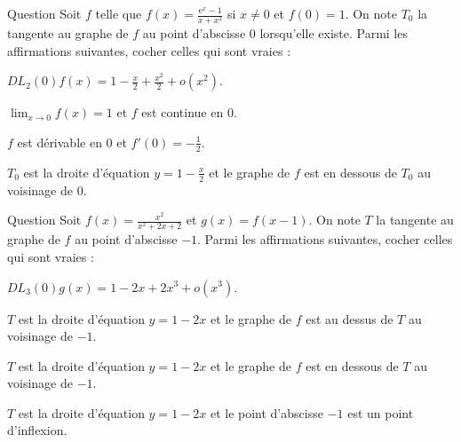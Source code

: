 \begin{multi}[multiple,feedback=
{Pour écrire le \(DL_2(0)f(x)\), on utilise le \(DL_3(0)(\mathrm{e}^{x}-1)\). La division suivant les puissances croissantes donne :
\[\displaystyle DL_2(0)f(x)=1-\frac{x}{2}+\frac{2x^2}{3}+o(x^2).\]
Ainsi \(\displaystyle \lim _{x\to 0}f(x)=1\) et \(f\) est continue en \(0\) et, puisque \(f\) admet un \(DL_1(0)\), \(f\) est dérivable en \(0\). De plus, \(T_0\) est la droite d'équation \(\displaystyle y=1-\frac{x}{2}\) et puisque \(\displaystyle f(x)-y=\frac{2x^2}{3}+o(x^2)\geq 0\) au voisinage de \(0\) : le graphe de \(f\) est au dessus de \(T_0\) au voisinage de \(0\).
}]{Question}
Soit \(f\) telle que \(\displaystyle f(x)=\frac{\mathrm{e}^{x}-1}{x+x^2}\) si \(x\neq 0\) et \(f(0)=1\). On note \(T_0\) la tangente au graphe de \(f\) au point d'abscisse \(0\) lorsqu'elle existe. Parmi les affirmations suivantes, cocher celles qui sont vraies :

    \item \(\displaystyle DL_2(0)f(x)=1-\frac{x}{2}+\frac{x^2}{2}+o(x^2)\).
    \item* \(\displaystyle \lim _{x\to 0}f(x)=1\) et \(f\) est continue en \(0\).
    \item* \(f\) est dérivable en \(0\) et \(\displaystyle f'(0)=-\frac{1}{2}\).
    \item \(T_0\) est la droite d'équation \(\displaystyle y=1-\frac{x}{2}\) et le graphe de \(f\) est en dessous de \(T_0\) au voisinage de \(0\).
\end{multi}


\begin{multi}[multiple,feedback=
{D'abord \(\displaystyle g(x)=\frac{1-2x+x^2}{1+x^2}=1-2x+2x^3+o(x^3)\). On en déduit que
\[\displaystyle DL_3(-1)f(x)=1-2(x+1)+2(x+1)^3+o\left((x+1)^3\right).\]
Donc \(T\) est la droite d'équation \(y=1-2(x+1)\) et le point d'abscisse \(-1\) est un point d'inflexion.
}]{Question}
Soit \(\displaystyle f(x)=\frac{x^2}{x^2+2x+2}\) et \(g(x)=f(x-1)\). On note \(T\) la tangente au graphe de \(f\) au point d'abscisse \(-1\). Parmi les affirmations suivantes, cocher celles qui sont vraies :

    \item* \(\displaystyle DL_3(0)g(x)=1-2x+2x^3+o(x^3)\).
    \item \(T\) est la droite d'équation \(y=1-2x\) et le graphe de \(f\) est au dessus de \(T\) au voisinage de \(-1\).
    \item \(T\) est la droite d'équation \(y=1-2x\) et le graphe de \(f\) est en dessous de \(T\) au voisinage de \(-1\).
    \item \(T\) est la droite d'équation \(y=1-2x\) et le point d'abscisse \(-1\) est un point d'inflexion.
\end{multi}


